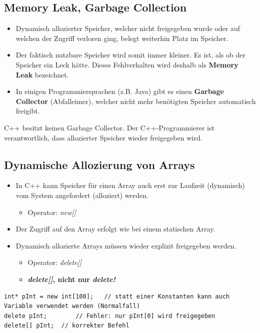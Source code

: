 \subsection{Memory Leak, Garbage Collection}
\begin{itemize}
	\item Dynamisch allozierter Speicher, welcher nicht freigegeben wurde oder auf welchen der Zugriff verloren ging, belegt weiterhin Platz im Speicher.
	\item Der faktisch nutzbare Speicher wird somit immer kleiner. Es ist, als ob der Speicher ein Leck hätte. Dieses Fehlverhalten wird deshalb als \textbf{Memory Leak} bezeichnet.
	\item In einigen Programmiersprachen (z.B. Java) gibt es einen \textbf{Garbage Collector} (Abfalleimer), welcher nicht mehr benötigten Speicher automatisch freigibt.
\end{itemize}
\begin{achtung}
C++ besitzt keinen Garbage Collector. Der C++-Programmierer ist verantwortlich, dass allozierter Speicher wieder freigegeben wird.
\end{achtung}

\subsection{Dynamische Allozierung von Arrays}
\begin{itemize}
	\item In C++ kann Speicher für einen Array auch erst zur Laufzeit (dynamisch) vom System angefordert (alloziert) werden.
	\begin{itemize}
		\item Operator: \emph{new[]}
	\end{itemize}
	\item Der Zugriff auf den Array erfolgt wie bei einem statischen Array.
	\item Dynamisch allozierte Arrays müssen wieder explizit freigegeben werden.
	\begin{itemize}
		\item Operator: \emph{delete[]}
		\item \textbf{\emph{delete[]}, nicht nur \emph{delete!}}
	\end{itemize}
\end{itemize}
\noindent
\begin{minipage}{\linewidth}
\begin{lstlisting}
int* pInt = new int[100];	// statt einer Konstanten kann auch Variable verwendet werden (Normalfall)
delete pInt;		// Fehler: nur pInt[0] wird freigegeben
delete[] pInt;	// korrekter Befehl
\end{lstlisting}
\end{minipage} 

